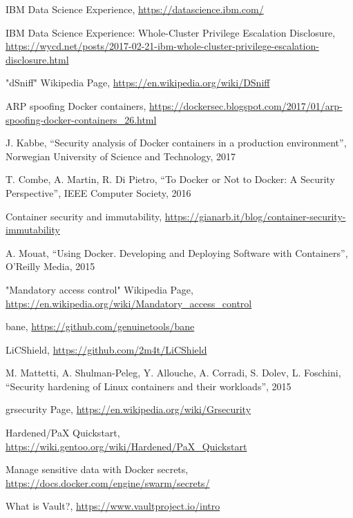 \documentclass[a4paper,12pt]{article}
\begin{document}
\begin{thebibliography}{99}
IBM Data Science Experience, \url{https://datascience.ibm.com/}

IBM Data Science Experience: Whole-Cluster Privilege Escalation Disclosure,
\url{https://wycd.net/posts/2017-02-21-ibm-whole-cluster-privilege-escalation-disclosure.html}

"dSniff" Wikipedia Page, \url{https://en.wikipedia.org/wiki/DSniff}

ARP spoofing Docker containers,
\url{https://dockersec.blogspot.com/2017/01/arp-spoofing-docker-containers_26.html}

J. Kabbe, ``Security analysis of Docker containers in
a production environment'', Norwegian University of Science and Technology, 2017

T. Combe, A. Martin, R. Di Pietro, ``To Docker or Not to Docker: A Security
Perspective'', IEEE Computer Society, 2016

Container security and immutability,
\url{https://gianarb.it/blog/container-security-immutability}

A. Mouat, ``Using Docker. Developing and Deploying Software with Containers'',
O'Reilly Media, 2015

"Mandatory access control" Wikipedia Page,
\url{https://en.wikipedia.org/wiki/Mandatory_access_control}

bane, \url{https://github.com/genuinetools/bane}

LiCShield, \url{https://github.com/2m4t/LiCShield}

M. Mattetti, A. Shulman-Peleg, Y. Allouche, A. Corradi, S. Dolev, L. Foschini,
``Security hardening of Linux containers and their workloads'', 2015

grsecurity Page, \url{https://en.wikipedia.org/wiki/Grsecurity}


Hardened/PaX Quickstart,
\url{https://wiki.gentoo.org/wiki/Hardened/PaX_Quickstart}

Manage sensitive data with Docker secrets,
\url{https://docs.docker.com/engine/swarm/secrets/}

What is Vault?, \url{https://www.vaultproject.io/intro}


\end{thebibliography}
\end{document}
